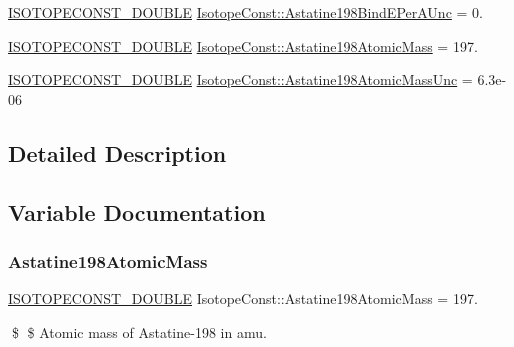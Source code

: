 \begin{DoxyCompactItemize}
\mbox{\hyperlink{group___isotope_const-_macros_ga8f45a7272ce02c0b4c65c44636ed719a}{I\+S\+O\+T\+O\+P\+E\+C\+O\+N\+S\+T\+\_\+\+D\+O\+U\+B\+LE}} \mbox{\hyperlink{group___isotope_const-_astatine-_at198_ga282ad23bffc3ca07fe9bf1df2f372f46}{Isotope\+Const\+::\+Astatine198\+Bind\+E\+Per\+A\+Unc}} = 0.
\item 
\mbox{\hyperlink{group___isotope_const-_macros_ga8f45a7272ce02c0b4c65c44636ed719a}{I\+S\+O\+T\+O\+P\+E\+C\+O\+N\+S\+T\+\_\+\+D\+O\+U\+B\+LE}} \mbox{\hyperlink{group___isotope_const-_astatine-_at198_gae02c0fef8f423dc4ce55d7598d868ee7}{Isotope\+Const\+::\+Astatine198\+Atomic\+Mass}} = 197.
\item 
\mbox{\hyperlink{group___isotope_const-_macros_ga8f45a7272ce02c0b4c65c44636ed719a}{I\+S\+O\+T\+O\+P\+E\+C\+O\+N\+S\+T\+\_\+\+D\+O\+U\+B\+LE}} \mbox{\hyperlink{group___isotope_const-_astatine-_at198_ga336d61380507f4c7ae6fe323295ecc79}{Isotope\+Const\+::\+Astatine198\+Atomic\+Mass\+Unc}} = 6.\+3e-\/06
\end{DoxyCompactItemize}


\subsection{Detailed Description}


\subsection{Variable Documentation}
\mbox{\label{group___isotope_const-_astatine-_at198_gae02c0fef8f423dc4ce55d7598d868ee7}} 
\subsubsection{\texorpdfstring{Astatine198\+Atomic\+Mass}{Astatine198AtomicMass}}
{\footnotesize\ttfamily \mbox{\hyperlink{group___isotope_const-_macros_ga8f45a7272ce02c0b4c65c44636ed719a}{I\+S\+O\+T\+O\+P\+E\+C\+O\+N\+S\+T\+\_\+\+D\+O\+U\+B\+LE}} Isotope\+Const\+::\+Astatine198\+Atomic\+Mass = 197.}

\$ \$ Atomic mass of Astatine-\/198 in amu. \mbox{\label{group___isotope_const-_astatine-_at198_ga336d61380507f4c7ae6fe323295ecc79}} 
